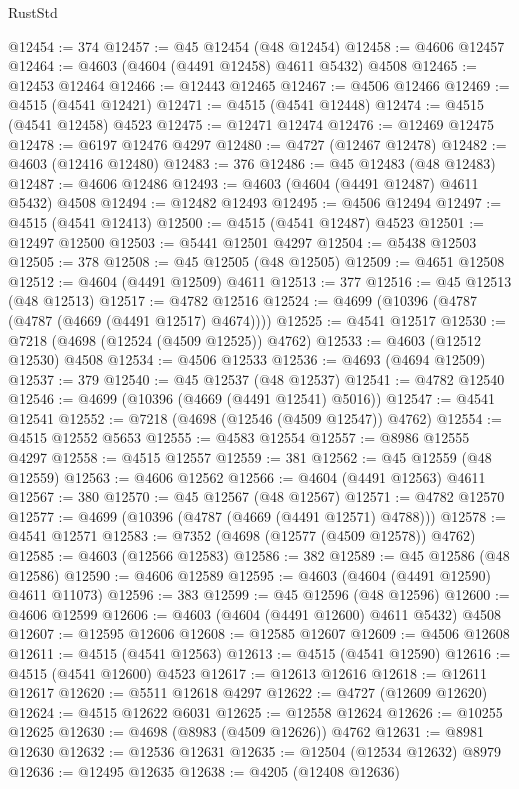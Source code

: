 \begin{lexlean}{RustStd}
\begin{coremodule}
@12454 := 374
@12457 := @45 @12454 (@48 @12454)
@12458 := @4606 @12457
@12464 := @4603 (@4604 (@4491 @12458) @4611 @5432) @4508
@12465 := @12453 @12464
@12466 := @12443 @12465
@12467 := @4506 @12466
@12469 := @4515 (@4541 @12421)
@12471 := @4515 (@4541 @12448)
@12474 := @4515 (@4541 @12458) @4523
@12475 := @12471 @12474
@12476 := @12469 @12475
@12478 := @6197 @12476 @4297
@12480 := @4727 (@12467 @12478)
@12482 := @4603 (@12416 @12480)
@12483 := 376
@12486 := @45 @12483 (@48 @12483)
@12487 := @4606 @12486
@12493 := @4603 (@4604 (@4491 @12487) @4611 @5432) @4508
@12494 := @12482 @12493
@12495 := @4506 @12494
@12497 := @4515 (@4541 @12413)
@12500 := @4515 (@4541 @12487) @4523
@12501 := @12497 @12500
@12503 := @5441 @12501 @4297
@12504 := @5438 @12503
@12505 := 378
@12508 := @45 @12505 (@48 @12505)
@12509 := @4651 @12508
@12512 := @4604 (@4491 @12509) @4611
@12513 := 377
@12516 := @45 @12513 (@48 @12513)
@12517 := @4782 @12516
@12524 := @4699 (@10396 (@4787 (@4787 (@4669 (@4491 @12517) @4674))))
@12525 := @4541 @12517
@12530 := @7218 (@4698 (@12524 (@4509 @12525)) @4762)
@12533 := @4603 (@12512 @12530) @4508
@12534 := @4506 @12533
@12536 := @4693 (@4694 @12509)
@12537 := 379
@12540 := @45 @12537 (@48 @12537)
@12541 := @4782 @12540
@12546 := @4699 (@10396 (@4669 (@4491 @12541) @5016))
@12547 := @4541 @12541
@12552 := @7218 (@4698 (@12546 (@4509 @12547)) @4762)
@12554 := @4515 @12552 @5653
@12555 := @4583 @12554
@12557 := @8986 @12555 @4297
@12558 := @4515 @12557
@12559 := 381
@12562 := @45 @12559 (@48 @12559)
@12563 := @4606 @12562
@12566 := @4604 (@4491 @12563) @4611
@12567 := 380
@12570 := @45 @12567 (@48 @12567)
@12571 := @4782 @12570
@12577 := @4699 (@10396 (@4787 (@4669 (@4491 @12571) @4788)))
@12578 := @4541 @12571
@12583 := @7352 (@4698 (@12577 (@4509 @12578)) @4762)
@12585 := @4603 (@12566 @12583)
@12586 := 382
@12589 := @45 @12586 (@48 @12586)
@12590 := @4606 @12589
@12595 := @4603 (@4604 (@4491 @12590) @4611 @11073)
@12596 := 383
@12599 := @45 @12596 (@48 @12596)
@12600 := @4606 @12599
@12606 := @4603 (@4604 (@4491 @12600) @4611 @5432) @4508
@12607 := @12595 @12606
@12608 := @12585 @12607
@12609 := @4506 @12608
@12611 := @4515 (@4541 @12563)
@12613 := @4515 (@4541 @12590)
@12616 := @4515 (@4541 @12600) @4523
@12617 := @12613 @12616
@12618 := @12611 @12617
@12620 := @5511 @12618 @4297
@12622 := @4727 (@12609 @12620)
@12624 := @4515 @12622 @6031
@12625 := @12558 @12624
@12626 := @10255 @12625
@12630 := @4698 (@8983 (@4509 @12626)) @4762
@12631 := @8981 @12630
@12632 := @12536 @12631
@12635 := @12504 (@12534 @12632) @8979
@12636 := @12495 @12635
@12638 := @4205 (@12408 @12636)

\end{coremodule}
\end{lexlean}
